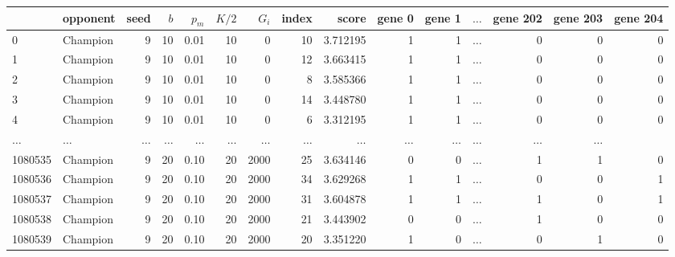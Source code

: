 \begin{tabular}{llrrrrrrrrrrrrr}
\toprule
{} &  opponent &  seed &  $b$ &  $p_m$ &  $K/2$ &  $G_i$ &  index &     score &  gene 0 &  gene 1 &  \(\dots\) &  gene 202 &  gene 203 &  gene 204 \\
\midrule
0       &  Champion &     9 &   10 &   0.01 &     10 &      0 &     10 &  3.712195 &       1 &       1 & \(\dots\) &  0 &         0 &         0 \\
1       &  Champion &     9 &   10 &   0.01 &     10 &      0 &     12 &  3.663415 &       1 &       1 & \(\dots\) &  0 &         0 &         0 \\
2       &  Champion &     9 &   10 &   0.01 &     10 &      0 &      8 &  3.585366 &       1 &       1 & \(\dots\) &  0 &         0 &         0 \\
3       &  Champion &     9 &   10 &   0.01 &     10 &      0 &     14 &  3.448780 &       1 &       1 & \(\dots\) &  0 &         0 &         0 \\
4       &  Champion &     9 &   10 &   0.01 &     10 &      0 &      6 &  3.312195 &       1 &       1 & \(\dots\) &  0 &         0 &         0 \\
\(\dots\)  &  \(\dots\)  &   \(\dots\)  &   \(\dots\)  & \(\dots\)  &  \(\dots\)  & \(\dots\)          & \(\dots\) &       \(\dots\)  &       \(\dots\)  &  \(\dots\)    & \(\dots\)  &         \(\dots\)  &         \(\dots\)  \\
1080535 &  Champion &     9 &   20 &   0.10 &     20 &   2000 &     25 &  3.634146 &       0 &       0 & \(\dots\) &  1 &         1 &         0 \\
1080536 &  Champion &     9 &   20 &   0.10 &     20 &   2000 &     34 &  3.629268 &       1 &       1 & \(\dots\) &  0 &         0 &         1 \\
1080537 &  Champion &     9 &   20 &   0.10 &     20 &   2000 &     31 &  3.604878 &       1 &       1 & \(\dots\) &  1 &         0 &         1 \\
1080538 &  Champion &     9 &   20 &   0.10 &     20 &   2000 &     21 &  3.443902 &       0 &       0 & \(\dots\) &  1 &         0 &         0 \\
1080539 &  Champion &     9 &   20 &   0.10 &     20 &   2000 &     20 &  3.351220 &       1 &       0 & \(\dots\) &  0 &         1 &         0 \\
\bottomrule
\end{tabular}
